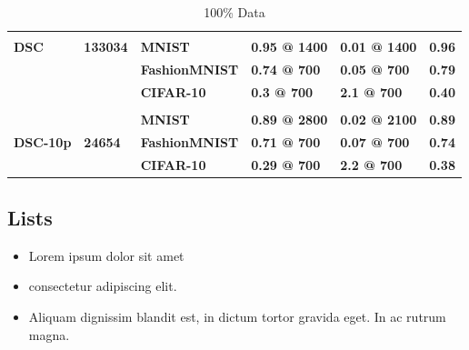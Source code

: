 \documentclass{article}
\begin{document}
\begin{table}[]
\begin{tabular}{@{}llllll@{}}
                                  &                                 &                          &                      &                      &                          \\
\textbf{DSC}                      & \textbf{133034}                 & \textbf{MNIST}           & \textbf{0.95 @ 1400} & \textbf{0.01 @ 1400} & \textbf{0.96}            \\
\textbf{}                         & \textbf{}                       & \textbf{FashionMNIST}    & \textbf{0.74 @ 700}  & \textbf{0.05 @ 700}  & \textbf{0.79}            \\
\textbf{}                         & \textbf{}                       & \textbf{CIFAR-10}        & \textbf{0.3 @ 700}   & \textbf{2.1 @ 700}   & \textbf{0.40}            \\
                                  &                                 &                          &                      &                      &                          \\
\multirow{3}{*}{\textbf{DSC-10p}} & \multirow{3}{*}{\textbf{24654}} & \textbf{MNIST}           & \textbf{0.89 @ 2800} & \textbf{0.02 @ 2100} & \textbf{0.89}            \\
                                  &                                 & \textbf{FashionMNIST}    & \textbf{0.71 @ 700}  & \textbf{0.07 @ 700}  & \textbf{0.74}            \\
                                  &                                 & \textbf{CIFAR-10}        & \textbf{0.29 @ 700}  & \textbf{2.2 @ 700}   & \textbf{0.38}            \\ \cmidrule(l){3-6} 
\end{tabular}
\caption{100\% Data}
\label{tab:my-table}
\end{table}





\subsection{Lists}
\begin{itemize}
\item Lorem ipsum dolor sit amet
\item consectetur adipiscing elit. 
\item Aliquam dignissim blandit est, in dictum tortor gravida eget. In ac rutrum magna.
\end{itemize}
\end{document}
